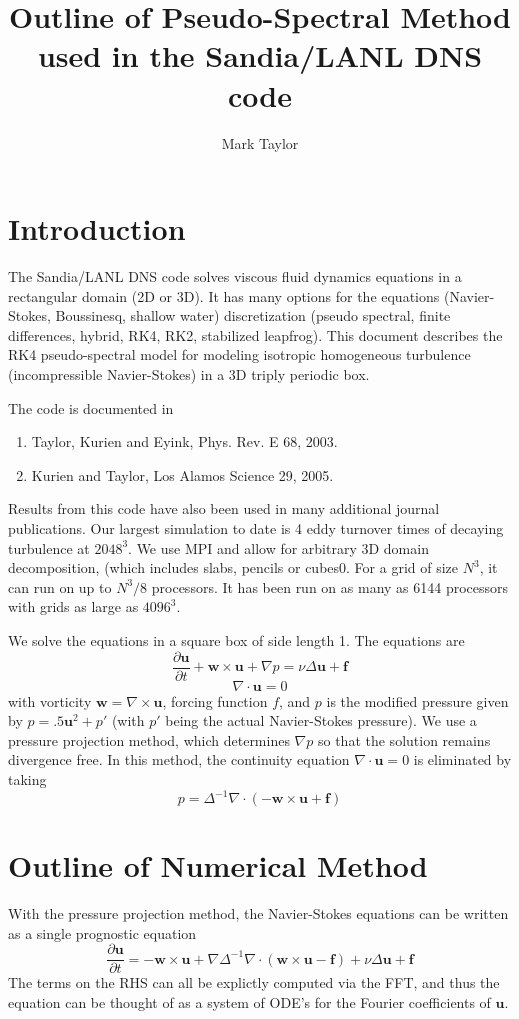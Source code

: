 \documentclass[12pt]{article}
\title{Outline of Pseudo-Spectral Method used in the Sandia/LANL DNS code}
\author{Mark Taylor}
\newcommand{\uv}{\mathbf u}
\newcommand{\vor}{\mathbf w}
\newcommand{\f}{\mathbf f}
\newcommand{\grad}{\nabla}
\newcommand{\curl}{\grad \times}
\renewcommand{\div}{\grad \cdot}
\begin{document}
\maketitle
\tableofcontents

\section{Introduction}
The Sandia/LANL DNS code solves viscous fluid dynamics equations in a
rectangular domain (2D or 3D).  It has many options for the equations
(Navier-Stokes, Boussinesq, shallow water) discretization (pseudo spectral, 
finite differences, hybrid, RK4, RK2, stabilized leapfrog).  This document
describes the RK4 pseudo-spectral model for modeling isotropic homogeneous
turbulence (incompressible Navier-Stokes) in a 3D triply periodic box.

The code is documented in 
\begin{enumerate}
\item Taylor, Kurien and Eyink, Phys. Rev. E 68, 2003. 
\item Kurien and Taylor, Los Alamos Science 29, 2005. 
\end{enumerate}
Results from this code have also been used in many additional journal
publications.  Our largest simulation to date is 4 eddy turnover
times of decaying turbulence at $2048^3$.  We use MPI and allow
for arbitrary 3D domain decomposition, (which includes slabs,
pencils or cubes0.  For a grid of size $N^3$, it
can run on up to $N^3/8$ processors.  It has 
been run on as many as 6144 processors with grids as large
as $4096^3$.

We solve the equations in a square box of side length 1.
The equations are
\[
\frac{ \partial  \uv }{\partial t}  + \vor  \times \uv + 
\grad p   = \nu \Delta \uv + \f
\]
\[
\div \uv = 0
\]
with vorticity $\vor = \curl \uv$, forcing function $f$, and $p$ is the modified pressure
given by $p = .5 \uv^2 + p'$ (with $p'$ being the actual Navier-Stokes pressure).
We use a pressure projection method, which determines
$\grad p$ so that the solution remains
divergence free.  In this method, the continuity equation $\div \uv = 0$
is eliminated by taking
\[
 p =  \Delta^{-1} \div \left( -\vor \times \uv  + \f \right)
\]




\section{Outline of Numerical Method}
With the pressure projection method, the Navier-Stokes equations
can be written as a single prognostic equation
\[
\frac{ \partial  \uv }{\partial t} = 
  - \vor  \times \uv + 
\grad \Delta^{-1} \div \left( \vor \times \uv  -\f \right) +  \nu \Delta \uv + \f
\]
The terms on the RHS can all be explictly computed via the FFT, and
thus the equation can be thought of as a system of ODE's for the
Fourier coefficients of $\uv$.  
\end{document}
